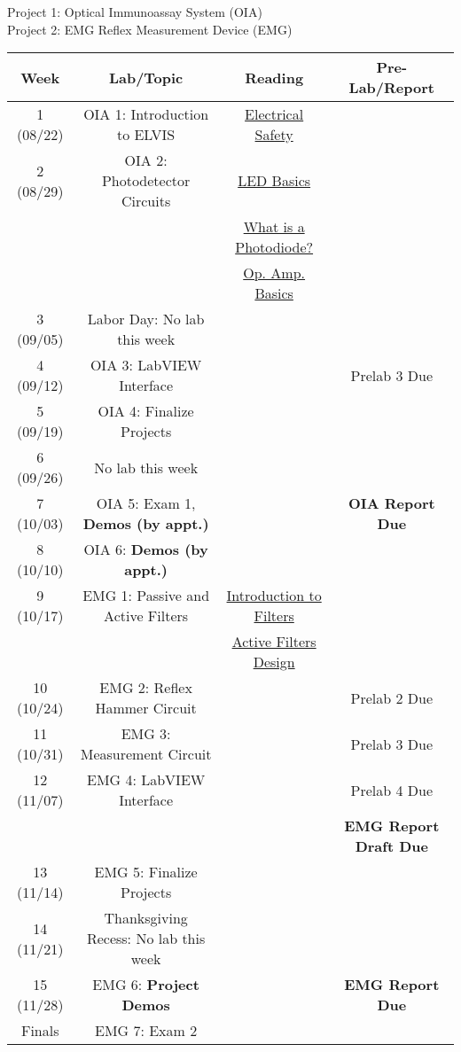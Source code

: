 \documentclass{article}
\begin{document}
{\color{red} Project 1: Optical Immunoassay System (OIA)}\\

{\color{blue} Project 2: EMG Reflex Measurement Device (EMG)}\\

\begin{table}[h!]
	\centering
\begin{tabular}[h!]{cccc}
\toprule
	Week & Lab/Topic & Reading & Pre-Lab/Report\\
	\midrule
	1 (08/22) & {\color{red} OIA 1: Introduction to ELVIS} & \href{https://www.electronicshub.org/electrical-safety/}{Electrical Safety} & \\
	2 (08/29) & {\color{red} OIA 2: Photodetector Circuits} & \href{https://www.electronicshub.org/light-emitting-diode-basics/}{LED Basics} & \\
		& & \href{https://www.electronicshub.org/photodiode-working-characteristics-applications/}{What is a Photodiode?} & \\
		& & \href{https://www.electronicshub.org/operational-amplifier-basics/}{Op. Amp. Basics} &\\
	\midrule
	3 (09/05) & Labor Day: No lab this week & &\\
	\midrule
	4 (09/12) & {\color{red} OIA 3: LabVIEW Interface} & & {\color{red} Prelab 3 Due}\\
	5 (09/19) & {\color{red} OIA 4: Finalize Projects} & &\\
	6 (09/26) & No lab this week & & \\
	7 (10/03) & {\color{red} OIA 5: Exam 1, \textbf{Demos (by appt.)}} & & {\color{red} \textbf{OIA Report Due}}\\
	8 (10/10) & {\color{red} OIA 6: \textbf{Demos (by appt.)}} & &\\
	\midrule
	9 (10/17) & {\color{blue} EMG 1: Passive and Active Filters} & \href{https://www.electronicshub.org/introduction-to-filters-and-capacitive-reactance/}{Introduction to Filters} & \\
		& & \href{https://www.electronicshub.org/active-filters-design/}{Active Filters Design} & \\
	10 (10/24) & {\color{blue} EMG 2: Reflex Hammer Circuit} & & {\color{blue} Prelab 2 Due}\\
	11 (10/31) & {\color{blue} EMG 3: Measurement Circuit} & & {\color{blue} Prelab 3 Due}\\
	12 (11/07) & {\color{blue} EMG 4: LabVIEW Interface} & & {\color{blue} Prelab 4 Due}\\
	& & & {\color{blue} \textbf{EMG Report Draft Due}}\\
	13 (11/14) & {\color{blue} EMG 5: Finalize Projects} & & \\
	\midrule
	14 (11/21) & Thanksgiving Recess: No lab this week & & \\
	\midrule
	15 (11/28) & {\color{blue} EMG 6: \textbf{Project Demos}} & & {\color{blue} \textbf{EMG Report Due}}\\
	Finals & {\color{blue} EMG 7: Exam 2} & &\\
	\bottomrule
\end{tabular}
\end{table}
\end{document}
